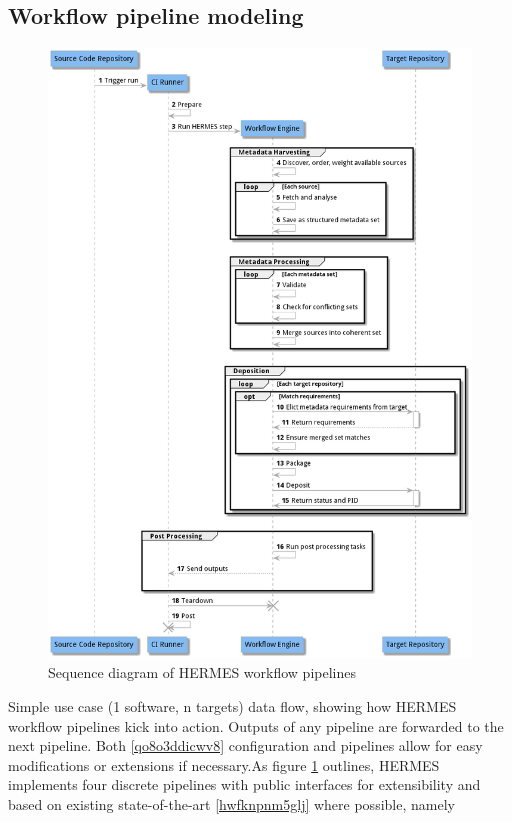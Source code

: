 \documentclass{article}
\begin{document}
\subsection{Workflow pipeline modeling}\label{d6s9gv9l0w6e}
\begin{figure}
\centering
\includegraphics[width=\textwidth]{assets/j4ecrtn7gls3.png}
\caption{Sequence diagram of HERMES workflow pipelines}
\label{j4ecrtn7gls3}
\end{figure}
Simple use case (1 software, n targets) data flow, showing how HERMES workflow pipelines kick into action. Outputs of any pipeline are forwarded to the next pipeline. Both \ref{qo8o3ddicwv8} configuration and pipelines allow for easy modifications or extensions if necessary.As figure \ref{j4ecrtn7gls3} outlines, HERMES implements four discrete pipelines with public interfaces for extensibility and based on existing state-of-the-art \ref{hwfknpnm5glj} where possible, namely
\end{document}
